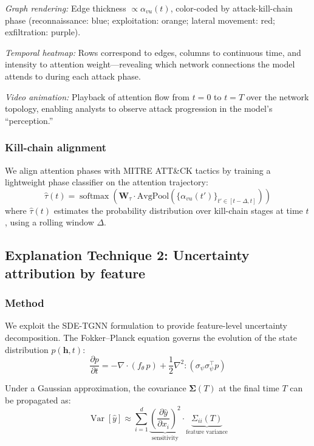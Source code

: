 \documentclass[preprint,review,12pt]{elsarticle}
\DeclareMathOperator{\Var}{Var}
\DeclareMathOperator{\softmax}{softmax}
\begin{document}
\textit{Graph rendering:} Edge thickness $\propto \alpha_{vu}(t)$, color-coded by attack-kill-chain phase (reconnaissance: blue; exploitation: orange; lateral movement: red; exfiltration: purple).

\textit{Temporal heatmap:} Rows correspond to edges, columns to continuous time, and intensity to attention weight---revealing which network connections the model attends to during each attack phase.

\textit{Video animation:} Playback of attention flow from $t{=}0$ to $t{=}T$ over the network topology, enabling analysts to observe attack progression in the model's ``perception.''

\subsubsection{Kill-chain alignment}
We align attention phases with MITRE ATT\&CK tactics \cite{mitre_attack} by training a lightweight phase classifier on the attention trajectory:
\begin{equation}
    \hat{\tau}(t) = \softmax\!\left(\mathbf{W}_\tau \cdot \text{AvgPool}\!\left(\{\alpha_{vu}(t')\}_{t' \in [t-\Delta, t]}\right)\right)
\end{equation}
where $\hat{\tau}(t)$ estimates the probability distribution over kill-chain stages at time $t$, using a rolling window $\Delta$.

\subsection{Explanation Technique 2: Uncertainty attribution by feature}

\subsubsection{Method}
We exploit the SDE-TGNN formulation to provide feature-level uncertainty decomposition. The Fokker--Planck equation governs the evolution of the state distribution $p(\mathbf{h}, t)$:
\begin{equation}
    \frac{\partial p}{\partial t} = -\nabla \cdot (f_\theta \, p) + \frac{1}{2} \nabla^2 : (\sigma_\psi \sigma_\psi^\top p)
\end{equation}

Under a Gaussian approximation, the covariance $\boldsymbol{\Sigma}(T)$ at the final time $T$ can be propagated as:
\begin{equation}\label{eq:uncertainty_decomp}
    \Var[\hat{y}] \approx \sum_{i=1}^{d} \underbrace{\left(\frac{\partial \hat{y}}{\partial x_i}\right)^2}_{\text{sensitivity}} \cdot \underbrace{\Sigma_{ii}(T)}_{\text{feature variance}}
\end{equation}
\end{document}
